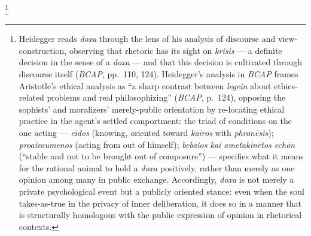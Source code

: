 \documentclass{article}
\begin{document}
\footnote{Heidegger reads \textit{doxa} through the lens of his analysis of discourse and view-construction, observing that rhetoric has its sight on \textit{krisis} --- a definite decision in the sense of a \textit{doxa} --- and that this decision is cultivated through discourse itself (\textit{BCAP}, pp.~110, 124). Heidegger's analysis in \textit{BCAP} frames Aristotle's ethical analysis as ``a sharp contrast between \textit{legein} about ethics-related problems and real philosophizing'' (\textit{BCAP}, p.~124), opposing the sophists' and moralizers' merely-public orientation by re-locating ethical practice in the agent's settled comportment: the triad of conditions on the one acting --- \textit{eidos} (knowing, oriented toward \textit{kairos} with \textit{phron\=esis}); \textit{proairoumenos} (acting from out of himself); \textit{bebaios kai ametakin\=etos echōn} (``stable and not to be brought out of composure'') --- specifies what it means for the rational animal to hold a \textit{doxa} positively, rather than merely as one opinion among many in public exchange. Accordingly, \textit{doxa} is not merely a private psychological event but a publicly oriented stance: even when the soul takes-as-true in the privacy of inner deliberation, it does so in a manner that is structurally homologous with the public expression of opinion in rhetorical contexts.}
\end{document}
